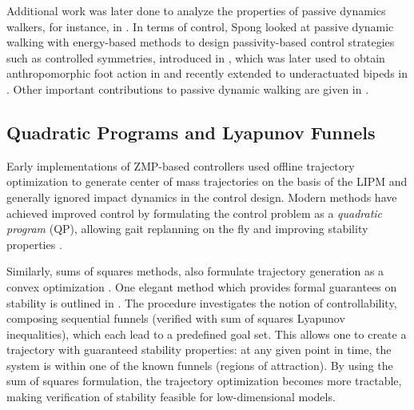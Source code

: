 Additional work was later done to analyze the properties of passive dynamics
walkers, for instance, in \cite{Espiau1994, Garcia1998, Borzova2004}.
%
In terms of control, Spong \cite{Spong1999} looked at passive dynamic walking with
energy-based methods to design passivity-based control strategies such as
controlled symmetries, introduced in \cite{Spong2005}, which was later used to
obtain anthropomorphic foot action in \cite{Sinnet2009, Sinnet2009a} and recently
extended to underactuated bipeds in \cite{Hu2011}.
Other important contributions to passive dynamic walking are given in
\cite{Kuo1999, Kuo2002, Anderson2005, Wisse2007}.
%

\subsection{Quadratic Programs and Lyapunov Funnels}


Early implementations of ZMP-based controllers used offline trajectory
optimization to generate center of mass trajectories on the basis of the LIPM
and generally ignored impact dynamics in the control design. Modern methods have
achieved improved control by formulating the control problem as a {\em quadratic
  program} (QP), allowing gait replanning on the fly and improving stability
properties \cite{Kudoh2002, Stephens2010, Herdt2010}.
%

Similarly, sums of squares methods, also formulate trajectory generation as a
convex optimization \cite{Tedrake2010}.
%
One elegant method which provides formal guarantees on stability is outlined in
\cite{Majumdar2013}.
%
The procedure investigates the notion of controllability, composing sequential
funnels (verified with sum of squares Lyapunov inequalities), which each lead to
a predefined goal set.
%
This allows one to create a trajectory with guaranteed stability properties:
%
at any given point in time, the system is within one of the known funnels
(regions of attraction).
%
By using the sum of squares formulation, the trajectory optimization becomes
more tractable, making verification of stability feasible for low-dimensional
models.
